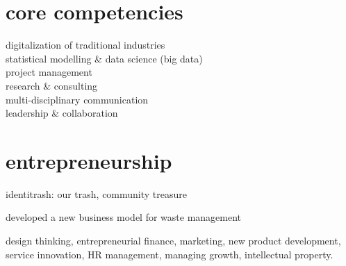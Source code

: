 \hfill
\begin{minipage}[t]{0.675\textwidth} %
\section{core competencies}
\textbullet{} digitalization of traditional industries\\ \textbullet{} statistical modelling \& data science (big data)\\
\textbullet{} project management\\
\textbullet{} research \& consulting\\
\textbullet{} multi-disciplinary communication\\
\textbullet{} leadership \& collaboration

\sectionspace %

\section{entrepreneurship} 
\vspace{\topsep}
\begin{tightitemize}
\item identitrash: our trash, community treasure
\item developed a new business model for waste management
\end{tightitemize}
\vspace{6pt}
\begin{tightitemize}
\item design thinking, entrepreneurial finance, marketing, new product development, service innovation, HR management, managing growth, intellectual property.
\end{tightitemize}

\sectionspace %


\end{minipage}
